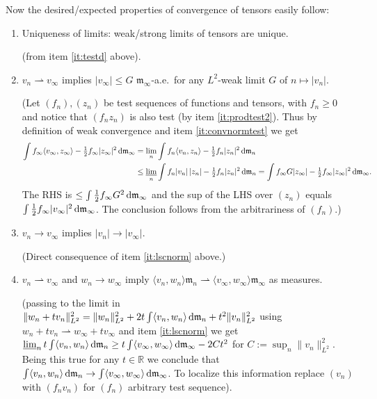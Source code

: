 \documentclass[11pt]{article}
\numberwithin{equation}{section}
\newcommand{\R}{\mathbb{R}}
\newcommand{\mm}{{\mathfrak m}}
\renewcommand{\d}{{\rm d}}
\newcommand{\limi}{\varliminf}
\newcommand{\weakto}{\rightharpoonup}
\newcommand\la{\langle}
\newcommand\ra{\rangle}
\begin{document}
\noindent Now the desired/expected properties of convergence of tensors easily follow:
\begin{enumerate}[label=(\roman*)]

\item {\sc Uniqueness of limits}: weak/strong limits of tensors are unique.{\footnotesize {\vspace{-5pt}}

 (from  item \ref{it:testd} above).}


\item\label{it:lscnorm}  $v_n\weakto v_\infty$ implies $|v_\infty|\leq G$ $\mm_\infty$-a.e.\ for any $L^2$-weak limit $G$ of $n\mapsto |v_n|$.

{\footnotesize {\vspace{-5pt}}(Let $(f_n),(z_n)$ be test sequences of functions and tensors, with $f_n\geq0$ and notice that $(f_nz_n)$ is also test (by item \ref{it:prodtest2}). Thus by definition of weak convergence and item \ref{it:convnormtest} we get 
\[
\begin{split}
 \int f_\infty\la v_\infty,z_\infty\ra-\tfrac12f_\infty|z_\infty|^2\,\d\mm_\infty&=\lim_n\int f_n\la v_n,z_n\ra-\tfrac12f_n|z_n|^2\,\d\mm_n\\
 &\leq\limi_n\int f_n|v_n|\,|z_n|-\tfrac12f_n|z_n|^2\,\d\mm_n=\int f_\infty G|z_\infty|-\tfrac12f_\infty|z_\infty|^2\,\d\mm_\infty.
 \end{split}
\]
The RHS is $\leq \int \tfrac12f_\infty G^2\,\d\mm_\infty$ and the sup of the LHS over $(z_n)$ equals   $\int \tfrac12f_\infty |v_\infty|^2\,\d\mm_\infty$. The conclusion follows from the arbitrariness of $(f_n)$.)}

\item\label{it:strpoint} $v_n\to v_\infty$ implies $|v_n|\to |v_\infty|$. 

{\footnotesize {\vspace{-5pt}} (Direct consequence of   item \ref{it:lscnorm} above.)}

\item\label{it:combinate} $v_n\weakto v_\infty$ and $w_n\to w_\infty$ imply $\la v_n,w_n\ra\mm_n\weakto \la v_\infty,w_\infty\ra\mm_\infty$ as measures.

{\footnotesize {\vspace{-5pt}}(passing to the limit in $\|w_n+tv_n\|^2_{L^2}=\|w_n\|^2_{L^2}+2t\int \la v_n,w_n\ra\,\d\mm_n+t^2\|v_n\|^2_{L^2}$ using  $w_n+tv_n\weakto w_\infty+tv_\infty$ and item \ref{it:lscnorm} we get $\limi_n t\int \la v_n,w_n\ra\,\d\mm_n\geq t \int \la v_\infty,w_\infty\ra\,\d\mm_\infty-2Ct^2$ for $C:=\sup_n\|v_n\|^2_{L^2}$. Being this true for any $t\in\R$ we conclude that $ \int\la v_n,w_n\ra\,\d\mm_n\to  \int\la v_\infty,w_\infty\ra\,\d\mm_\infty$. To localize this information  replace $(v_n)$ with $(f_nv_n)$ for $(f_n)$ arbitrary test sequence).}


\end{enumerate}
\end{document}
